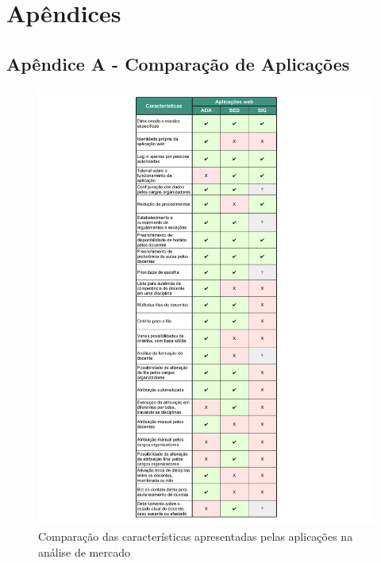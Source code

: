 \documentclass[12pt]{article}
\begin{document}



\section{Apêndices}\label{sec:figs}

\subsection{Apêndice A - Comparação de Aplicações} 

\begin{figure}[h]
    \centering
    \includegraphics[width=.8\textwidth]{comparacaoaplicacoes.png}
    \caption{Comparação das características apresentadas pelas aplicações na análise de mercado}
    \label{fig:comparacao}
\end{figure}
\end{document}
